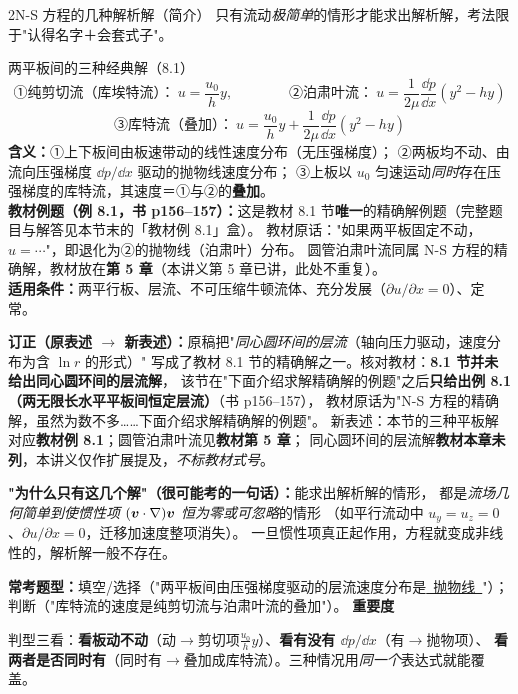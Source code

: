 \begin{kaodian}{2}{N-S 方程的几种解析解（简介）}
只有流动\emph{极简单}的情形才能求出解析解，考法限于"认得名字＋会套式子"。

\begin{gongshi}{两平板间的三种经典解（8.1）}
\[ \text{①纯剪切流（库埃特流）：}\ u=\frac{u_0}{h}y,\qquad\qquad
   \text{②泊肃叶流：}\ u=\frac{1}{2\mu}\frac{\dd p}{\dd x}\left(y^2-hy\right) \]
\[ \text{③库特流（叠加）：}\ u=\frac{u_0}{h}y+\frac{1}{2\mu}\frac{\dd p}{\dd x}\left(y^2-hy\right) \]
\textbf{含义：}①上下板间由板速带动的线性速度分布（无压强梯度）；
②两板均不动、由流向压强梯度 $\dd p/\dd x$ 驱动的抛物线速度分布；
③上板以 $u_0$ 匀速运动\emph{同时}存在压强梯度的库特流，其速度＝①与②的\textbf{叠加}。\\
\textbf{教材例题（例 8.1，书 p156--157）：}这是教材 8.1 节\textbf{唯一}的精确解例题（完整题目与解答见本节末的「教材例 8.1」盒）。
教材原话："如果两平板固定不动，$u=\cdots$"，即退化为②的抛物线（泊肃叶）分布。
圆管泊肃叶流同属 N-S 方程的精确解，教材放在\textbf{第 5 章}（本讲义第 5 章已讲，此处不重复）。\\
\textbf{适用条件：}两平行板、层流、不可压缩牛顿流体、充分发展（$\partial u/\partial x=0$）、定常。
\end{gongshi}

\begin{tishi}
\textbf{订正（原表述 $\to$ 新表述）：}原稿把"\emph{同心圆环间的层流}（轴向压力驱动，速度分布为含 $\ln r$ 的形式）"
写成了教材 8.1 节的精确解之一。核对教材：\textbf{8.1 节并未给出同心圆环间的层流解}，
该节在"下面介绍求解精确解的例题"之后\textbf{只给出例 8.1（两无限长水平平板间恒定层流）}（书 p156--157），
教材原话为"N-S 方程的精确解，虽然为数不多……下面介绍求解精确解的例题"。
新表述：本节的三种平板解对应\textbf{教材例 8.1}；圆管泊肃叶流见\textbf{教材第 5 章}；
同心圆环间的层流解\textbf{教材本章未列}，本讲义仅作扩展提及，\emph{不标教材式号}。
\end{tishi}

\begin{tishi}
\textbf{"为什么只有这几个解"（很可能考的一句话）：}能求出解析解的情形，
都是\emph{流场几何简单到使惯性项 $(\bm{v}\cdot\nabla)\bm{v}$ 恒为零或可忽略}的情形
（如平行流动中 $u_y=u_z=0$、$\partial u/\partial x=0$，迁移加速度整项消失）。
一旦惯性项真正起作用，方程就变成非线性的，解析解一般不存在。
\end{tishi}

\textbf{常考题型：}填空/选择（"两平板间由压强梯度驱动的层流速度分布是\underline{\ 抛物线\ }"）；
判断（"库特流的速度是纯剪切流与泊肃叶流的叠加"）。
\textbf{重要度 }\quad{}\quad{}

\begin{banfa}
判型三看：\textbf{看板动不动}（动$\to$剪切项$\frac{u_0}{h}y$）、\textbf{看有没有 $\dd p/\dd x$}（有$\to$抛物项）、
\textbf{看两者是否同时有}（同时有$\to$叠加成库特流）。三种情况用\emph{同一个}表达式就能覆盖。
\end{banfa}
\end{kaodian}

